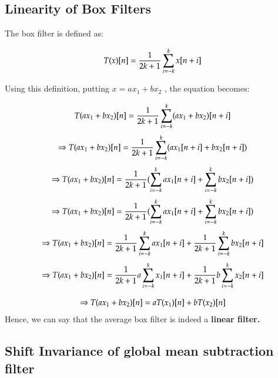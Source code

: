 \documentclass[a4paper,11pt]{article}
\begin{document}
\subsection{Linearity of Box Filters}

The box filter is defined as:

\begin{equation}
\large T(x)[n] = \frac{1}{2k+1} \sum_{i=-k}^{k} x[n+i] 
\end{equation}


Using this definition, putting $x=ax_1 + bx_2$ , the equation becomes:

\[
\large T(ax_1 + bx_2)[n] = \frac{1}{2k+1} \sum_{i=-k}^{k} (ax_1+bx_2)[n+i]
\]
\[
\Rightarrow \large T(ax_1 + bx_2)[n] = \frac{1}{2k+1} \sum_{i=-k}^{k}(ax_1[n+i]  +bx_2[n+i])
\]
\[
\Rightarrow \large T(ax_1 + bx_2)[n] = \frac{1}{2k+1} ( \sum_{i=-k}^{k}ax_1[n+i]  + \sum_{i=-k}^{k}bx_2[n+i])
\]
\[
\Rightarrow \large T(ax_1 + bx_2)[n] = \frac{1}{2k+1} ( \sum_{i=-k}^{k}ax_1[n+i]  + \sum_{i=-k}^{k}bx_2[n+i])
\]
\[
\Rightarrow \large T(ax_1 + bx_2)[n] = \frac{1}{2k+1} \sum_{i=-k}^{k}ax_1[n+i]  + \frac{1}{2k+1}\sum_{i=-k}^{k}bx_2[n+i]
\]
\[
\Rightarrow \large T(ax_1 + bx_2)[n] = \frac{1}{2k+1}a \sum_{i=-k}^{k}x_1[n+i]  + \frac{1}{2k+1}b\sum_{i=-k}^{k} x_2[n+i]
\]

\[
\Rightarrow \large T(ax_1 + bx_2)[n] = \large aT(x_1)[n] +bT(x_2)[n]
\]
\newline
Hence, we can say that the average box filter is indeed a \textbf{linear filter.}
\subsection{Shift Invariance of global mean subtraction filter}
\end{document}
